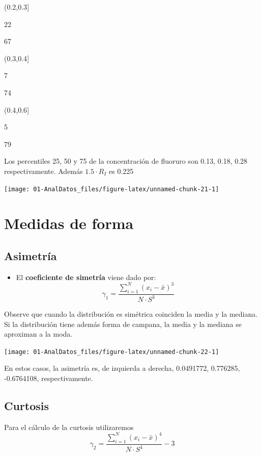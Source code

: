 \documentclass[]{book}
\providecommand{\tightlist}{%
  \setlength{\itemsep}{0pt}\setlength{\parskip}{0pt}}
\theoremstyle{definition}
\theoremstyle{definition}
\theoremstyle{definition}
\theoremstyle{remark}
\begin{document}
(0.2,0.3{]}

22

67

(0.3,0.4{]}

7

74

(0.4,0.6{]}

5

79

Los percentiles 25, 50 y 75 de la concentración de fluoruro son 0.13,
0.18, 0.28 respectivamente. Además \(1.5 \cdot R_I\) es 0.225

\begin{center}\texttt{[image: 01-AnalDatos\_files/figure-latex/unnamed-chunk-21-1]} \end{center}

\section{Medidas de forma}\label{medidas-de-forma}

\subsection{Asimetría}\label{asimetria}

\begin{itemize}
\tightlist
\item
  El \textbf{coeficiente de simetría} viene dado por:
  \[\gamma_1 = \frac{\sum_{i=1}^N (x_i - \bar{x})^3}{N \cdot S^3}\]
\end{itemize}

Observe que cuando la distribución es simétrica coinciden la media y la
mediana. Si la distribución tiene además forma de campana, la media y la
mediana se aproximan a la moda.

\begin{center}\texttt{[image: 01-AnalDatos\_files/figure-latex/unnamed-chunk-22-1]} \end{center}

En estos casos, la asimetría es, de izquierda a derecha, 0.0491772,
0.776285, -0.6764108, respectivamente.

\subsection{Curtosis}\label{curtosis}

Para el cálculo de la curtosis utilizaremos
\[\gamma_2  =  \frac{\sum_{i=1}^N (x_i - \bar{x})^4}{N \cdot S^4}-3\]
\end{document}
